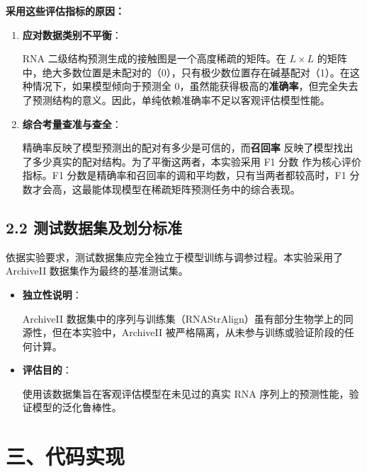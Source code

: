 \documentclass[a4paper,12pt]{article}
\begin{document}
\vspace{1em}
\noindent \textbf{采用这些评估指标的原因：}

\begin{enumerate}
    \item \textbf{应对数据类别不平衡}：
    
    \hspace{2em}RNA 二级结构预测生成的接触图是一个高度稀疏的矩阵。在 $L \times L$ 的矩阵中，绝大多数位置是未配对的（0），只有极少数位置存在碱基配对（1）。在这种情况下，如果模型倾向于预测全 0，虽然能获得极高的\textbf{准确率}，但完全失去了预测结构的意义。因此，单纯依赖准确率不足以客观评估模型性能。

    \item \textbf{综合考量查准与查全}：
    
    \hspace{2em}精确率反映了模型预测出的配对有多少是可信的，而\textbf{召回率} 反映了模型找出了多少真实的配对结构。为了平衡这两者，本实验采用 F1 分数 作为核心评价指标。F1 分数是精确率和召回率的调和平均数，只有当两者都较高时，F1 分数才会高，这最能体现模型在稀疏矩阵预测任务中的综合表现。
\end{enumerate}

\newpage

\subsection*{2.2 测试数据集及划分标准}


\hspace{2em}依据实验要求，测试数据集应完全独立于模型训练与调参过程。本实验采用了 ArchiveII 数据集作为最终的基准测试集。

\begin{itemize}
    \item \textbf{独立性说明}：
    
    \hspace{2em}ArchiveII 数据集中的序列与训练集（RNAStrAlign）虽有部分生物学上的同源性，但在本实验中，ArchiveII 被严格隔离，从未参与训练或验证阶段的任何计算。
    \item \textbf{评估目的}：
    
    \hspace{2em}使用该数据集旨在客观评估模型在未见过的真实 RNA 序列上的预测性能，验证模型的泛化鲁棒性。
\end{itemize}
\section*{三、代码实现}
\end{document}
